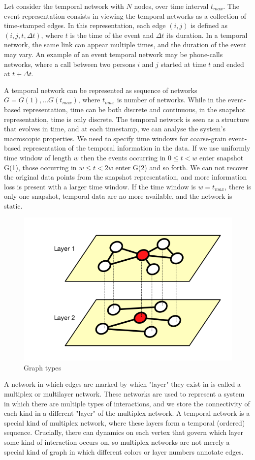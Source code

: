 Let consider the temporal network with $N$ nodes, over time interval $t_{max}$. The event representation consists in viewing the temporal networks as a collection of time-stamped edges. In this representation, each edge $(i, j)$ is defined as$(i, j, t, \Delta t)$, where $t$ is the time of the event and $\Delta t$ its duration. In a temporal network, the same link can appear multiple times, and the duration of the event may vary. An example of an event temporal network may be phone-calls networks, where a call between two persons $i$ and $j$ started at time $t$ and ended at $t + \Delta t$. 

A temporal network can be represented as sequence of networks $G= G(1), ... G(t_{max})$, where $t_{max}$ is number of networks. While in the event-based representation, time can be both discrete and continuous, in the snapshot representation, time is only discrete. The temporal network is seen as a structure that evolves in time, and at each timestamp, we can analyse the system's macroscopic properties. We need to specify time windows for coarse-grain event-based representation of the temporal information in the data. If we use uniformly time window of length $w$ then the events occurring in $0 \leq t < w$ enter snapshot G(1), those occurring in $w \leq t < 2w$ enter G(2) and so forth. We can not recover the original data points from the snapshot representation, and more information loss is present with a larger time window. If the time window is $w=t_{max}$, there is only one snapshot, temporal data are no more available, and the network is static. \\

\begin{figure}[h!]
	\centering
	\includegraphics[width=0.5\linewidth]{figures/methodology/graph5.png} 
	\caption{Graph types}
	\label{fig:gt5}
\end{figure}

A network in which edges are marked by which "layer" they exist in is called a multiplex or multilayer network. These networks are used to represent a system in which there are multiple types of interactions, and we store the connectivity of each kind in a different "layer" of the multiplex network. A temporal network is a special kind of multiplex network, where these layers form a temporal (ordered) sequence. Crucially, there can dynamics on each vertex that govern which layer some kind of interaction occurs on, so multiplex networks are not merely a special kind of graph in which different colors or layer numbers annotate edges. %

